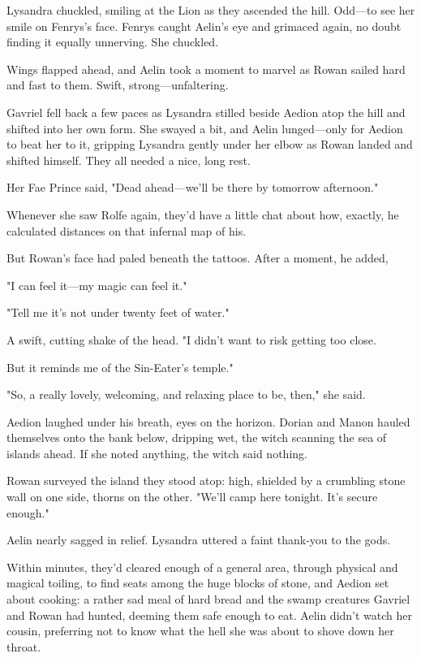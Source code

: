 Lysandra chuckled, smiling at the Lion as they ascended the hill.
Odd---to see her smile on Fenrys's face.
Fenrys caught Aelin's eye and grimaced again, no doubt finding it equally unnerving.
She chuckled.

Wings flapped ahead, and Aelin took a moment to marvel as Rowan sailed hard and fast to them.
Swift, strong---unfaltering.

Gavriel fell back a few paces as Lysandra stilled beside Aedion atop the hill and shifted into her own form.
She swayed a bit, and Aelin lunged---only for Aedion to beat her to it, gripping Lysandra gently under her elbow as Rowan landed and shifted himself.
They all needed a nice, long rest.

Her Fae Prince said, "Dead ahead---we'll be there by tomorrow afternoon."

Whenever she saw Rolfe again, they'd have a little chat about how, exactly, he calculated distances on that infernal map of his.

But Rowan's face had paled beneath the tattoos.
After a moment, he added,

"I can feel it---my magic can feel it."

"Tell me it's not under twenty feet of water."

A swift, cutting shake of the head.
"I didn't want to risk getting too close.

But it reminds me of the Sin-Eater's temple."

"So, a really lovely, welcoming, and relaxing place to be, then," she said.

Aedion laughed under his breath, eyes on the horizon.
Dorian and Manon hauled themselves onto the bank below, dripping wet, the witch scanning the sea of islands ahead.
If she noted anything, the witch said nothing.

Rowan surveyed the island they stood atop: high, shielded by a crumbling stone wall on one side, thorns on the other.
"We'll camp here tonight.
It's secure enough."

Aelin nearly sagged in relief.
Lysandra uttered a faint thank-you to the gods.

Within minutes, they'd cleared enough of a general area, through physical and magical toiling, to find seats among the huge blocks of stone, and Aedion set about cooking: a rather sad meal of hard bread and the swamp creatures Gavriel and Rowan had hunted, deeming them safe enough to eat.
Aelin didn't watch her cousin, preferring not to know what the hell she was about to shove down her throat.

